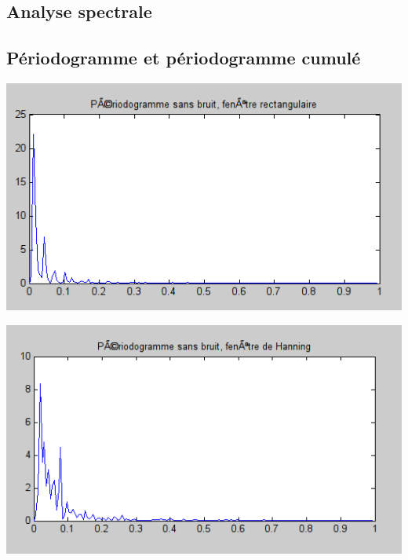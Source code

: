 \documentclass{beamer}
\begin{document}
\begin{frame}
\section{Analyse spectrale}
\subsection{Périodogramme et périodogramme cumulé}
\begin{center}
\includegraphics[scale=0.5]{capture/E.png}
\end{center}
\end{frame}

\begin{frame}
\begin{center}
\includegraphics[scale=0.4]{capture/F.png}
\end{center}
\end{frame}
\end{document}
